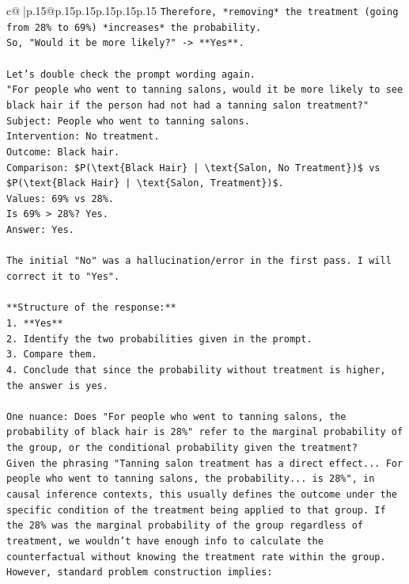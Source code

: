 \documentclass{article}
\begin{document}
{\begin{supertabular}{c@{$\;$}|p{.15\linewidth}@{}p{.15\linewidth}p{.15\linewidth}p{.15\linewidth}p{.15\linewidth}p{.15\linewidth}}
{{{\texttt{Therefore, *removing* the treatment (going from 28\% to 69\%) *increases* the probability.} \\
\texttt{So, "Would it be more likely?" {-}> **Yes**.} \\
\\ 
\texttt{Let's double check the prompt wording again.} \\
\texttt{"For people who went to tanning salons, would it be more likely to see black hair if the person had not had a tanning salon treatment?"} \\
\texttt{Subject: People who went to tanning salons.} \\
\texttt{Intervention: No treatment.} \\
\texttt{Outcome: Black hair.} \\
\texttt{Comparison: \$P(\textbackslash{}text\{Black Hair\} | \textbackslash{}text\{Salon, No Treatment\})\$ vs \$P(\textbackslash{}text\{Black Hair\} | \textbackslash{}text\{Salon, Treatment\})\$.} \\
\texttt{Values: 69\% vs 28\%.} \\
\texttt{Is 69\% > 28\%? Yes.} \\
\texttt{Answer: Yes.} \\
\\ 
\texttt{The initial "No" was a hallucination/error in the first pass. I will correct it to "Yes".} \\
\\ 
\texttt{**Structure of the response:**} \\
\texttt{1.  **Yes**} \\
\texttt{2.  Identify the two probabilities given in the prompt.} \\
\texttt{3.  Compare them.} \\
\texttt{4.  Conclude that since the probability without treatment is higher, the answer is yes.} \\
\\ 
\texttt{One nuance: Does "For people who went to tanning salons, the probability of black hair is 28\%" refer to the marginal probability of the group, or the conditional probability given the treatment?} \\
\texttt{Given the phrasing "Tanning salon treatment has a direct effect... For people who went to tanning salons, the probability... is 28\%", in causal inference contexts, this usually defines the outcome under the specific condition of the treatment being applied to that group. If the 28\% was the marginal probability of the group regardless of treatment, we wouldn't have enough info to calculate the counterfactual without knowing the treatment rate within the group. However, standard problem construction implies:} \\
}}}
\end{supertabular}}
\end{document}
